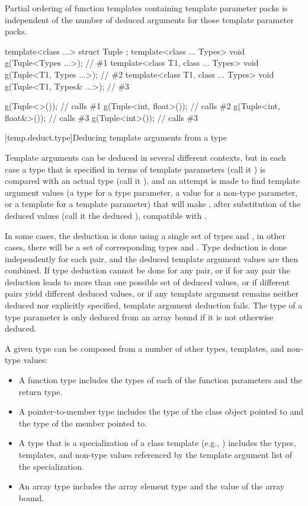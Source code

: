 \pnum
\begin{note}
Partial ordering of function templates containing
template parameter packs is independent of the number of deduced arguments
for those template parameter packs.
\end{note}
\begin{example}
\begin{codeblock}
template<class ...> struct Tuple { };
template<class ... Types> void g(Tuple<Types ...>);                 // \#1
template<class T1, class ... Types> void g(Tuple<T1, Types ...>);   // \#2
template<class T1, class ... Types> void g(Tuple<T1, Types& ...>);  // \#3

g(Tuple<>());                   // calls \#1
g(Tuple<int, float>());         // calls \#2
g(Tuple<int, float&>());        // calls \#3
g(Tuple<int>());                // calls \#3
\end{codeblock}
\end{example}

[temp.deduct.type]{Deducing template arguments from a type}

\pnum
Template arguments can be deduced in several different contexts, but
in each case a type that is specified in terms of template parameters
(call it
)
is compared with an actual type (call it
),
and an attempt is made to find template argument values (a type for a type
parameter, a value for a non-type parameter, or a template for a
template parameter) that will make
,
after substitution of the deduced values (call it the deduced
),
compatible with
.

\pnum
In some cases, the deduction is done using a single set of types
and
,
in other cases, there will be a set of corresponding types
and
.
Type deduction is done
independently for each
pair, and the deduced template
argument values are then combined.
If type deduction cannot be done
for any
pair, or if for any pair the deduction leads to more than
one possible set of deduced values, or if different pairs yield
different deduced values, or if any template argument remains neither
deduced nor explicitly specified, template argument deduction fails.
The type of a type parameter
is only deduced from an array bound
if it is not otherwise deduced.

\pnum
A given type
can be composed from a number of other
types, templates, and non-type values:

\begin{itemize}
\item
A function type includes the types of each of the function parameters
and the return type.
\item
A pointer-to-member type includes the type of the class object pointed to
and the type of the member pointed to.
\item
A type that is a specialization of a class template (e.g.,
)
includes the types, templates, and non-type values referenced by the
template argument list of the specialization.
\item
An array type includes the array element type and the value of the
array bound.
\end{itemize}

